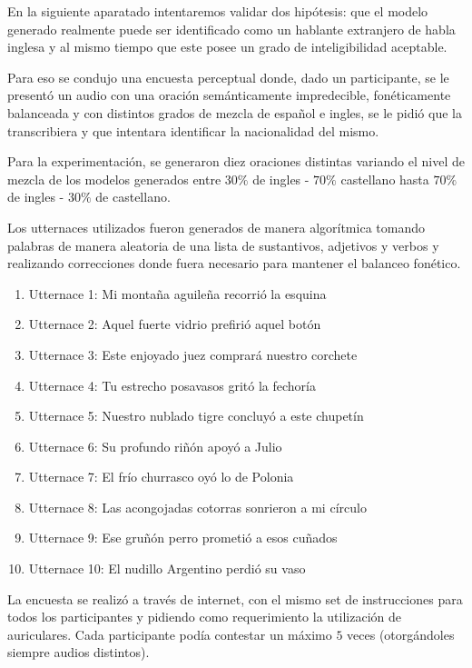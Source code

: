 
En la siguiente aparatado intentaremos validar dos hipótesis: que el modelo generado realmente puede ser identificado como un hablante extranjero de habla inglesa y al mismo tiempo que este posee un grado de inteligibilidad aceptable.

Para eso se condujo una encuesta perceptual donde, dado un participante, se le presentó un audio con una oración semánticamente impredecible, fonéticamente balanceada y con distintos grados de mezcla de español e ingles, se le pidió que la transcribiera y que intentara identificar la nacionalidad del mismo.

Para la experimentación, se generaron diez oraciones distintas variando el nivel de mezcla de los modelos generados entre $30\%$ de ingles - $70\%$ castellano hasta $70\%$ de ingles - $30\%$ de castellano.

Los utternaces utilizados fueron generados de manera algorítmica tomando palabras de manera aleatoria de una lista de sustantivos, adjetivos y verbos y realizando correcciones donde fuera necesario para mantener el balanceo fonético.

\begin{enumerate}
\item Utternace 1: Mi montaña aguileña recorrió la esquina
\item Utternace 2: Aquel fuerte vidrio prefirió aquel botón
\item Utternace 3: Este enjoyado juez comprará nuestro corchete
\item Utternace 4: Tu estrecho posavasos gritó la fechoría
\item Utternace 5: Nuestro nublado tigre concluyó a este chupetín
\item Utternace 6: Su profundo riñón apoyó a Julio
\item Utternace 7: El frío churrasco oyó lo de Polonia
\item Utternace 8: Las acongojadas cotorras sonrieron a mi círculo
\item Utternace 9: Ese gruñón perro prometió a esos cuñados
\item Utternace 10: El nudillo Argentino perdió su vaso
\end{enumerate}


La encuesta se realizó a través de internet, con el mismo set de instrucciones para todos los participantes y pidiendo como requerimiento la utilización de auriculares. Cada participante podía contestar un máximo $5$ veces (otorgándoles siempre audios distintos).

